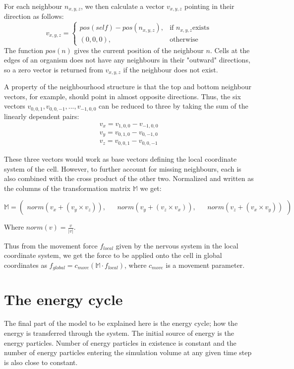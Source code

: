For each neighbour \(n_{x,y,z}\), we then calculate a vector \(v_{x,y,z}\) pointing in their direction as follows:
\[
v_{x,y,z} = 
\begin{cases}
pos(self) - pos(n_{x,y,z}), & \text{if }n_{x,y,z} \text{exists}\\
(0,0,0), & \text{otherwise}
\end{cases}
\]
The function \(pos(n)\) gives the current position of the neighbour \(n\).
Cells at the edges of an organism does not have any neighbours in their "outward" directions, so a zero vector is returned from \(v_{x,y,z}\) if the neighbour does not exist. 

A property of the neighbourhood structure is that the top and bottom neighbour vectors, for example, should point in almost opposite directions. Thus, the six vectors \(v_{0,0,1}, v_{0,0,-1}, ..., v_{-1,0,0}\) can be reduced to three by taking the sum of the linearly dependent pairs:
\begin{align*}
v_x = v_{1,0,0} - v_{-1,0,0}\\
v_y = v_{0,1,0} - v_{0,-1,0}\\
v_z = v_{0,0,1} - v_{0,0,-1}
\end{align*}

These three vectors would work as base vectors defining the local coordinate system of the cell. However, to further account for missing neighbours, each is also combined with the cross product of the other two. Normalized and written as the columns of the transformation matrix \(\mathbb{M}\) we get:

\[
\mathbb{M}=
\left(
\begin{matrix}
 norm(v_x + (v_y \times v_z)), &&
 norm(v_y + (v_z \times v_x)), &&
 norm(v_z + (v_x \times v_y))
\end{matrix}
\right)
\]

Where \(norm(v) = \frac{v}{|v|}\).

Thus from the movement force \(f_{local}\) given by the nervous system in the local coordinate system, we get the force to be applied onto the cell in global coordinates as \(f_{global} = 
c_{move}(\mathbb{M} \cdot f_{local} ) \), where \(c_{move}\) is a movement parameter.

\section{The energy cycle}
The final part of the model to be explained here is the energy cycle; how the energy is transferred through the system. The initial source of energy is the energy particles. Number of energy particles in existence is constant and the number of energy particles entering the simulation volume at any given time step is also close to constant.

